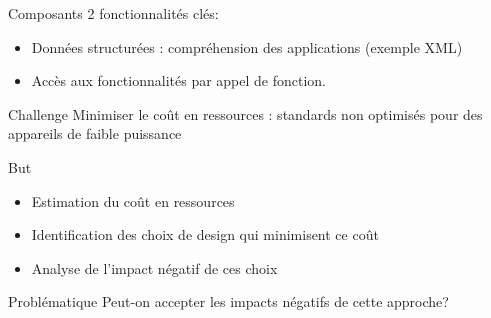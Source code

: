 \begin{frame}{Composants}
2 fonctionnalités clés:
\begin{itemize}
\item Données structurées : compréhension des applications (exemple XML)
\item Accès aux fonctionnalités par appel de fonction.%
\end{itemize}
\begin{block}{Challenge}
Minimiser le coût en ressources : standards non optimisés pour des appareils de faible puissance
\end{block}
\end{frame}

\begin{frame}{But}
\begin{itemize}
\item Estimation du coût en ressources
\item Identification des choix de design qui minimisent ce coût
\item Analyse de l'impact négatif de ces choix 
\end{itemize}
\begin{block}{Problématique}
Peut-on accepter les impacts négatifs de cette approche?
\end{block}
\end{frame}

